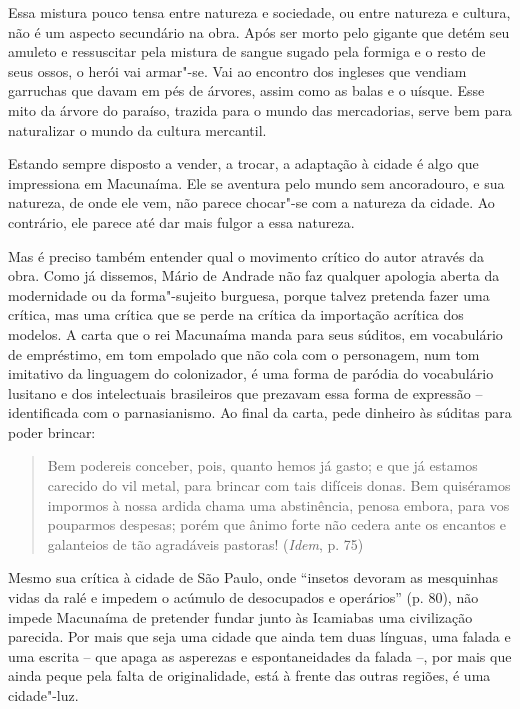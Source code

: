 {Essa mistura pouco tensa entre natureza e sociedade, ou entre natureza e
cultura, não é um aspecto secundário na obra. Após ser morto pelo
gigante que detém seu amuleto e ressuscitar pela mistura de sangue
sugado pela formiga e o resto de seus ossos, o herói vai armar"-se. Vai
ao encontro dos ingleses que vendiam garruchas que davam em pés de
árvores, assim como as balas e o uísque. Esse mito da árvore do paraíso,
trazida para o mundo das mercadorias, serve bem para naturalizar o mundo
da cultura mercantil.

Estando sempre disposto a vender, a trocar, a adaptação à cidade é algo
que impressiona em Macunaíma. Ele se aventura pelo mundo sem
ancoradouro, e sua natureza, de onde ele vem, não parece chocar"-se com a
natureza da cidade. Ao contrário, ele parece até dar mais fulgor a essa
natureza.

Mas é preciso também entender qual o movimento crítico do autor através
da obra. Como já dissemos, Mário de Andrade não faz qualquer apologia
aberta da modernidade ou da forma"-sujeito burguesa, porque talvez
pretenda fazer uma crítica, mas uma crítica que se perde na crítica da
importação acrítica dos modelos. A carta que o rei Macunaíma manda para
seus súditos, em vocabulário de empréstimo, em tom empolado que não cola
com o personagem, num tom imitativo da linguagem do colonizador, é uma
forma de paródia do vocabulário lusitano e dos intelectuais brasileiros
que prezavam essa forma de expressão -- identificada com o
parnasianismo. Ao final da carta, pede dinheiro às súditas para poder
brincar:

\begin{quote}
Bem podereis conceber, pois, quanto hemos já gasto; e que já estamos
carecido do vil metal, para brincar com tais difíceis donas. Bem
quiséramos impormos à nossa ardida chama uma abstinência, penosa embora,
para vos pouparmos despesas; porém que ânimo forte não cedera ante os
encantos e galanteios de tão agradáveis pastoras! (\emph{Idem}, p. 75)
\end{quote}

Mesmo sua crítica à cidade de São Paulo, onde ``insetos devoram as
mesquinhas vidas da ralé e impedem o acúmulo de desocupados e
operários'' (p. 80), não impede Macunaíma de pretender fundar junto às
Icamiabas uma civilização parecida. Por mais que seja uma cidade que
ainda tem duas línguas, uma falada e uma escrita -- que apaga as
asperezas e espontaneidades da falada --, por mais que ainda peque pela
falta de originalidade, está à frente das outras regiões, é uma
cidade"-luz.

}
